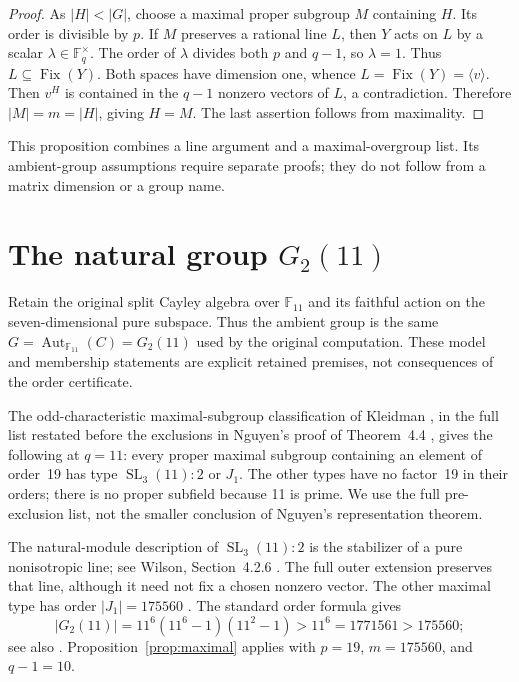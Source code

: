 \documentclass[11pt]{article}
\newcommand{\old}{\marginpar{\scriptsize\textsf{Earlier theory}}}
\begin{document}
\begin{proof}
As $|H|<|G|$, choose a maximal proper subgroup $M$ containing $H$.
Its order is divisible by $p$. If $M$ preserves a rational line $L$,
then $Y$ acts on $L$ by a scalar $\lambda\in\mathbb F_q^\times$.
The order of $\lambda$ divides both $p$ and $q-1$, so $\lambda=1$.
Thus $L\subseteq\operatorname{Fix}(Y)$. Both spaces have dimension one,
whence $L=\operatorname{Fix}(Y)=\langle v\rangle$.
Then $v^H$ is contained in the $q-1$ nonzero vectors of $L$, a
contradiction. Therefore $|M|=m=|H|$, giving $H=M$.
The last assertion follows from maximality.
\end{proof}

This proposition combines a line argument and a maximal-overgroup
list. Its ambient-group assumptions require separate proofs; they do
not follow from a matrix dimension or a group name.

\section{The natural group \(G_2(11)\)}

\old
Retain the original split Cayley algebra over $\mathbb F_{11}$ and its
faithful action on the seven-dimensional pure subspace. Thus the ambient
group is the same $G=\operatorname{Aut}_{\mathbb F_{11}}(C)=G_2(11)$
used by the original computation. These model and membership statements
are explicit retained premises, not consequences of the order certificate.

The odd-characteristic maximal-subgroup classification of Kleidman
\cite{Kleidman}, in the full list restated before the exclusions in
Nguyen's proof of Theorem~4.4 \cite{Nguyen}, gives the following at
$q=11$: every proper maximal subgroup containing an element of
order~19 has type $\operatorname{SL}_3(11):2$ or $J_1$.
The other types have no factor~19 in their orders; there is no proper
subfield because 11 is prime. We use the full pre-exclusion list,
not the smaller conclusion of Nguyen's representation theorem.

The natural-module description of $\operatorname{SL}_3(11):2$ is
the stabilizer of a pure nonisotropic line; see Wilson, Section~4.2.6
\cite{Wilson}. The full outer extension preserves that line, although
it need not fix a chosen nonzero vector.
The other maximal type has order $|J_1|=175560$ \cite{Atlas}.
The standard order formula gives
\[
 |G_2(11)|=11^6(11^6-1)(11^2-1)>11^6=1771561>175560;
\]
see also \cite{BPP}.
Proposition~\ref{prop:maximal} applies with $p=19$, $m=175560$,
and $q-1=10$.
\end{document}
